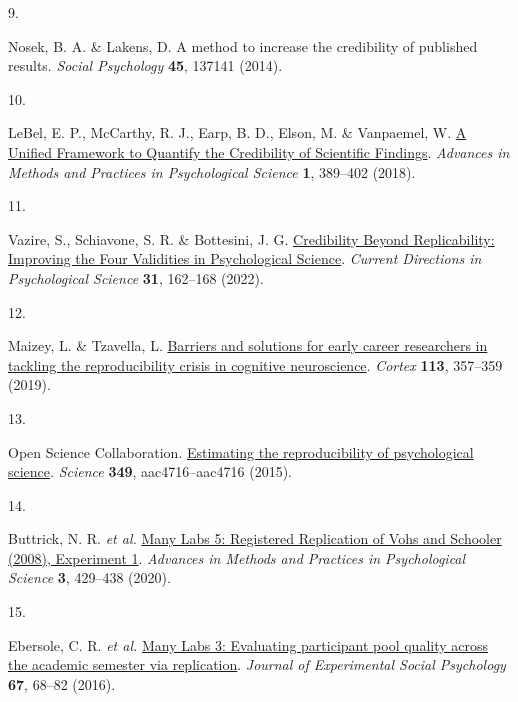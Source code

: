 \documentclass[
  man,floatsintext]{apa6}
\newlength{\cslhangindent}
\newlength{\csllabelwidth}
\newlength{\cslentryspacingunit} %
\newenvironment{CSLReferences}[2] %
 {%
  \setlength{\parindent}{0pt}
  \ifodd #1
  \let\oldpar\par
  \def\par{\hangindent=\cslhangindent\oldpar}
  \fi
  \setlength{\parskip}{#2\cslentryspacingunit}
 }%
 {}
\newcommand{\CSLLeftMargin}[1]{\parbox[t]{\csllabelwidth}{#1}}
\newcommand{\CSLRightInline}[1]{\parbox[t]{\linewidth - \csllabelwidth}{#1}\break}
\begin{document}
\begin{CSLReferences}{0}{0}
\leavevmode{}%
\CSLLeftMargin{9. }%
\CSLRightInline{Nosek, B. A. \& Lakens, D. A method to increase the credibility of published results. \emph{Social Psychology} \textbf{45}, 137141 (2014).}

\leavevmode{}%
\CSLLeftMargin{10. }%
\CSLRightInline{LeBel, E. P., McCarthy, R. J., Earp, B. D., Elson, M. \& Vanpaemel, W. \href{https://doi.org/10.1177/2515245918787489}{A Unified Framework to Quantify the Credibility of Scientific Findings}. \emph{Advances in Methods and Practices in Psychological Science} \textbf{1}, 389--402 (2018).}

\leavevmode{}%
\CSLLeftMargin{11. }%
\CSLRightInline{Vazire, S., Schiavone, S. R. \& Bottesini, J. G. \href{https://doi.org/10.1177/09637214211067779}{Credibility Beyond Replicability: Improving the Four Validities in Psychological Science}. \emph{Current Directions in Psychological Science} \textbf{31}, 162--168 (2022).}

\leavevmode{}%
\CSLLeftMargin{12. }%
\CSLRightInline{Maizey, L. \& Tzavella, L. \href{https://doi.org/10.1016/j.cortex.2018.12.015}{Barriers and solutions for early career researchers in tackling the reproducibility crisis in cognitive neuroscience}. \emph{Cortex} \textbf{113}, 357--359 (2019).}

\leavevmode{}%
\CSLLeftMargin{13. }%
\CSLRightInline{Open Science Collaboration. \href{https://doi.org/10.1126/science.aac4716}{Estimating the reproducibility of psychological science}. \emph{Science} \textbf{349}, aac4716--aac4716 (2015).}

\leavevmode{}%
\CSLLeftMargin{14. }%
\CSLRightInline{Buttrick, N. R. \emph{et al.} \href{https://doi.org/10.1177/2515245920917931}{Many Labs 5: Registered Replication of Vohs and Schooler (2008), Experiment 1}. \emph{Advances in Methods and Practices in Psychological Science} \textbf{3}, 429--438 (2020).}

\leavevmode{}%
\CSLLeftMargin{15. }%
\CSLRightInline{Ebersole, C. R. \emph{et al.} \href{https://doi.org/10.1016/j.jesp.2015.10.012}{Many Labs 3: Evaluating participant pool quality across the academic semester via replication}. \emph{Journal of Experimental Social Psychology} \textbf{67}, 68--82 (2016).}


\end{CSLReferences}
\end{document}
